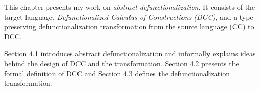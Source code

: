 
This chapter presents my work on \textit{abstract defunctionalization}. It consists of the target language, \textit{Defunctionalized Calculus of Constructions (DCC)}, and a type-preserving defunctionalization transformation from the source language (CC) to DCC. 

Section 4.1 introduces abstract defunctionalization and informally explains ideas behind the design of DCC and the transformation. Section 4.2 presents the formal definition of DCC and Section 4.3 defines the defunctionalization transformation.




